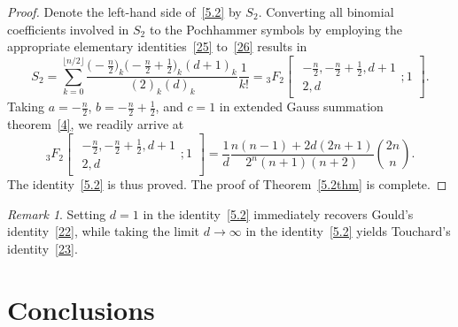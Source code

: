 \documentclass[reqno]{amsart}
\numberwithin{equation}{section}
\theoremstyle{plain}
\theoremstyle{remark}
\newtheorem{rem}{Remark}[section]
\begin{document}
\begin{proof}
Denote the left-hand side of~\eqref{5.2} by $S_2$. Converting all binomial coefficients involved in $S_2$ to the Pochhammer symbols by employing the appropriate elementary identities~\eqref{25} to~\eqref{26} results in
\[
S_2
= \sum_{k=0}^{\lfloor n/2 \rfloor}
\frac{\bigl(-\tfrac{n}{2}\bigr)_k\bigl(-\tfrac{n}{2}+\tfrac12\bigr)_k(d+1)_k}{(2)_k(d)_k}\frac{1}{k!}
= {}_3F_2\begin{bmatrix}
\begin{gathered}
-\tfrac{n}{2},-\tfrac{n}{2}+\tfrac12,d+1\\ 2,d
\end{gathered};1
\end{bmatrix}.
\]
Taking \(a=-\frac{n}{2}\), \(b=-\frac{n}{2}+\frac12\), and \(c=1\) in extended Gauss summation theorem~\eqref{4}, we readily arrive at
\[
{}_3F_2\begin{bmatrix}
\begin{gathered}
-\tfrac{n}{2},-\tfrac{n}{2}+\tfrac12,d+1\\ 2,d
\end{gathered};1
\end{bmatrix}=
\frac{1}{d}\frac{n(n-1)+2d(2n+1)}{2^{n}(n+1)(n+2)}\binom{2n}{n}.
\]
The identity~\eqref{5.2} is thus proved. The proof of Theorem~\ref{5.2thm} is complete.
\end{proof}

\begin{rem}
Setting $d = 1$ in the identity~\eqref{5.2} immediately recovers Gould's identity~\eqref{22}, while taking the limit $d \to \infty$ in the identity~\eqref{5.2} yields Touchard's identity~\eqref{23}.
\end{rem}

\section{Conclusions}
\end{document}
